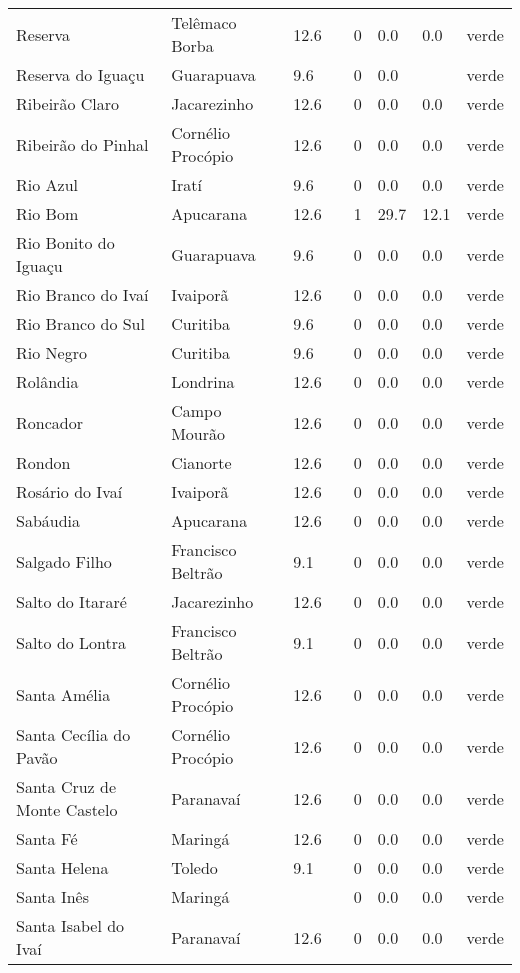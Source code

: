 \begin{longtable}{l|lllllll}
  Reserva & Telêmaco Borba & 12.6 &  & 0 & 0.0 & 0.0 & verde \\ 
  Reserva do Iguaçu & Guarapuava & 9.6 &  & 0 & 0.0 &  & verde \\ 
  Ribeirão Claro & Jacarezinho & 12.6 &  & 0 & 0.0 & 0.0 & verde \\ 
  Ribeirão do Pinhal & Cornélio Procópio & 12.6 &  & 0 & 0.0 & 0.0 & verde \\ 
  Rio Azul & Iratí & 9.6 &  & 0 & 0.0 & 0.0 & verde \\ 
  Rio Bom & Apucarana & 12.6 &  & 1 & 29.7 & 12.1 & verde \\ 
  Rio Bonito do Iguaçu & Guarapuava & 9.6 &  & 0 & 0.0 & 0.0 & verde \\ 
  Rio Branco do Ivaí & Ivaiporã & 12.6 &  & 0 & 0.0 & 0.0 & verde \\ 
  Rio Branco do Sul & Curitiba & 9.6 &  & 0 & 0.0 & 0.0 & verde \\ 
  Rio Negro & Curitiba & 9.6 &  & 0 & 0.0 & 0.0 & verde \\ 
  Rolândia & Londrina & 12.6 &  & 0 & 0.0 & 0.0 & verde \\ 
  Roncador & Campo Mourão & 12.6 &  & 0 & 0.0 & 0.0 & verde \\ 
  Rondon & Cianorte & 12.6 &  & 0 & 0.0 & 0.0 & verde \\ 
  Rosário do Ivaí & Ivaiporã & 12.6 &  & 0 & 0.0 & 0.0 & verde \\ 
  Sabáudia & Apucarana & 12.6 &  & 0 & 0.0 & 0.0 & verde \\ 
  Salgado Filho & Francisco Beltrão & 9.1 &  & 0 & 0.0 & 0.0 & verde \\ 
  Salto do Itararé & Jacarezinho & 12.6 &  & 0 & 0.0 & 0.0 & verde \\ 
  Salto do Lontra & Francisco Beltrão & 9.1 &  & 0 & 0.0 & 0.0 & verde \\ 
  Santa Amélia & Cornélio Procópio & 12.6 &  & 0 & 0.0 & 0.0 & verde \\ 
  Santa Cecília do Pavão & Cornélio Procópio & 12.6 &  & 0 & 0.0 & 0.0 & verde \\ 
  Santa Cruz de Monte Castelo & Paranavaí & 12.6 &  & 0 & 0.0 & 0.0 & verde \\ 
  Santa Fé & Maringá & 12.6 &  & 0 & 0.0 & 0.0 & verde \\ 
  Santa Helena & Toledo & 9.1 &  & 0 & 0.0 & 0.0 & verde \\ 
  Santa Inês & Maringá &  &  & 0 & 0.0 & 0.0 & verde \\ 
  Santa Isabel do Ivaí & Paranavaí & 12.6 &  & 0 & 0.0 & 0.0 & verde \\ 

\end{longtable}

